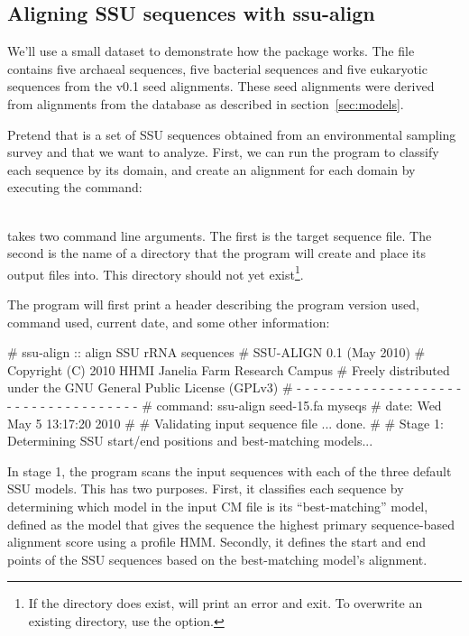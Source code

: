 \subsection{Aligning SSU sequences with ssu-align}

We'll use a small dataset to demonstrate how the package works.
The file  contains five archaeal sequences, five
bacterial sequences and five eukaryotic sequences from the
 v0.1 seed alignments. These seed alignments
were derived from alignments from the  database
\cite{CannoneGutell02} as described in section~\ref{sec:models}.

Pretend that  is a set of SSU sequences obtained from
an environmental sampling survey and that we want to analyze. First,
we can run the  program to classify each sequence by
its domain, and create an alignment for each domain by executing the
command:

\\

 takes two command line arguments. The first is the
target sequence file. The second is the name of a directory that the
program will create and place its output files into. This directory
should not yet exist\footnote{If the directory does exist,
   will print an error and exit. To overwrite an
  existing directory, use the  option.}.

The program will first print a header describing the program version
used, command used, current date, and some other information:

\begin{sreoutput}
# ssu-align :: align SSU rRNA sequences
# SSU-ALIGN 0.1 (May 2010)
# Copyright (C) 2010 HHMI Janelia Farm Research Campus
# Freely distributed under the GNU General Public License (GPLv3)
# - - - - - - - - - - - - - - - - - - - - - - - - - - - - - - - - - - - -
# command: ssu-align seed-15.fa myseqs
# date:    Wed May  5 13:17:20 2010
#
# Validating input sequence file ... done.
#
# Stage 1: Determining SSU start/end positions and best-matching models...
\end{sreoutput}

In stage 1, the program scans the input sequences with each of the
three default SSU models. This has two purposes.  First, it classifies
each sequence by determining which model in the input CM file is its
``best-matching'' model, defined as
the model that gives the sequence the highest primary sequence-based
alignment score using a profile HMM\@. Secondly, it
defines the start and end points of the SSU sequences based on the
best-matching model's alignment.

